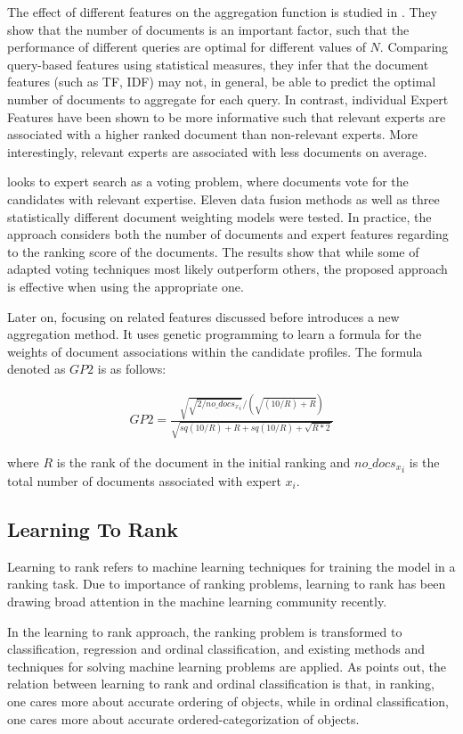 The effect of different features on the aggregation function is studied in \cite{agg-gp2}. They show that the number of documents is an important factor, such that the performance of different queries are optimal for different values of $N$. Comparing query-based features using statistical measures, they infer that the document features (such as TF, IDF) may not, in general, be able to predict the optimal number of documents to aggregate for each query. In contrast, individual Expert Features have been shown to be more informative such that relevant experts are associated with a higher ranked document than non-relevant experts. More interestingly, relevant experts are associated with less documents on average.

\cite{agg-vote} looks to expert search as a voting problem, where documents vote for the candidates with relevant expertise. Eleven data fusion methods as well as three statistically different document weighting models were tested. In practice, the approach considers both the number of documents and expert features regarding to the ranking score of the documents. The results show that while some of adapted voting techniques most likely outperform others, the proposed approach is effective when using the appropriate one.

Later on, focusing on related features discussed before \cite{agg-gp2} introduces a new aggregation method. It uses genetic programming to learn a formula for the weights of document associations within the candidate profiles. The formula denoted as $GP2$ is as follows:

\begin{align*}
GP2 = \frac{\sqrt{\sqrt{2/{no\_docs_x}_i}}/(\sqrt{(10/R)+R})}{\sqrt{sq(10/R)+R+sq(10/R)+\sqrt{R*2}}}
\end{align*}

\noindent 
where $R$ is the rank of the document in the initial ranking and ${no\_docs_x}_i$ is the total number of documents associated with expert $x_i$.

\subsection{Learning To Rank}
Learning to rank refers to machine learning techniques for training the model in a ranking task. Due to importance of ranking problems, learning to rank has been drawing broad attention in the machine learning community recently. 

In the learning to rank approach, the ranking problem is transformed to classification, regression and ordinal classification, and existing methods and techniques for solving machine learning problems are applied. As \cite{l2r-intro} points out, the relation between learning to rank and ordinal classification is that, in ranking, one cares more about accurate ordering of objects, while in ordinal classification, one cares more about accurate ordered-categorization of objects.

